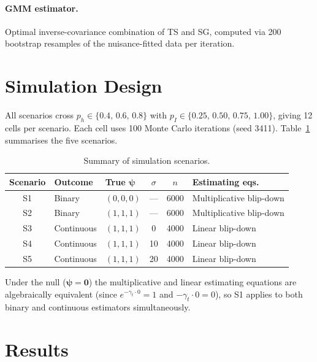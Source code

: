 \documentclass[12pt]{article}
\begin{document}
\paragraph{GMM estimator.}
Optimal inverse-covariance combination of TS and SG, computed via
200 bootstrap resamples of the nuisance-fitted data per iteration.


\section{Simulation Design}

All scenarios cross $p_h\in\{0.4,\,0.6,\,0.8\}$ with
$p_I\in\{0.25,\,0.50,\,0.75,\,1.00\}$, giving 12 cells per scenario.
Each cell uses 100 Monte Carlo iterations (seed 3411).
Table~\ref{tab:design} summarises the five scenarios.

\begin{table}[htbp]
\centering
\caption{Summary of simulation scenarios.}
\label{tab:design}
\small
\begin{tabular}{cllccl}
\toprule
Scenario & Outcome & True $\boldsymbol{\psi}$ & $\sigma$ & $n$ & Estimating eqs.\\
\midrule
S1 & Binary   & $(0,0,0)$   & ---  & 6000 & Multiplicative blip-down \\
S2 & Binary   & $(1,1,1)$   & ---  & 6000 & Multiplicative blip-down \\
S3 & Continuous & $(1,1,1)$ & 0    & 4000 & Linear blip-down \\
S4 & Continuous & $(1,1,1)$ & 10   & 4000 & Linear blip-down \\
S5 & Continuous & $(1,1,1)$ & 20   & 4000 & Linear blip-down \\
\bottomrule
\end{tabular}
\end{table}

\noindent Under the null ($\boldsymbol{\psi}=\mathbf{0}$) the multiplicative and linear
estimating equations are algebraically equivalent (since
$e^{-\gamma_t\cdot 0}=1$ and $-\gamma_t\cdot 0=0$), so S1 applies
to both binary and continuous estimators simultaneously.

\section{Results}
\end{document}

